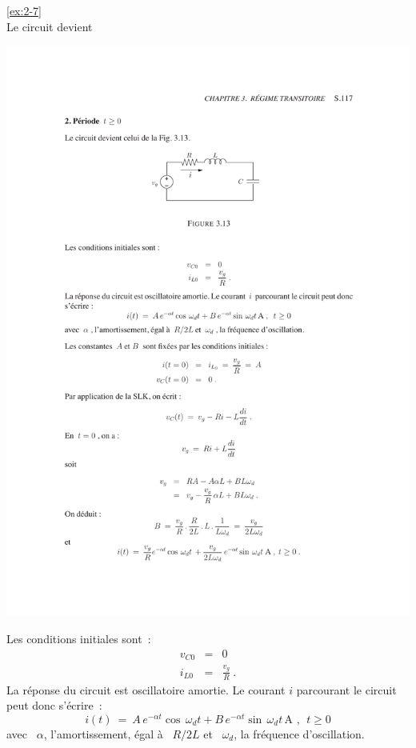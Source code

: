 \begin{solexercise}{\ref{ex:2-7}}
\\
Le circuit devient
\begin{center}
	\includegraphics[width=\linewidth]{sol_exercices/ex3-7-2}
\end{center}
Les conditions initiales sont~:
\begin{eqnarray*}
	v_{C0} &=& 0\\
	i_{L0} &=& \frac{v_g}{R}~.
\end{eqnarray*}
La r\'eponse du circuit est oscillatoire amortie. Le courant $i$
parcourant le circuit peut donc s'\'ecrire~:
\[ i(t) \: = \: A \, e^{-\alpha t} \cos\, \omega_d t + 
B\, e^{-\alpha t} \sin \, \omega_d t\, \text{A~}, ~~t\geq 0 \]
avec \ $\alpha$, l'amortissement, \'egal \`a \ $R/2L$
et \ $\omega_d$, la fr\'equence d'oscillation.


\end{solexercise}
